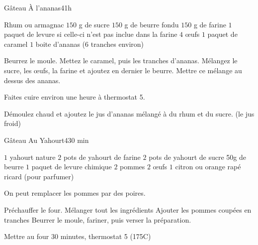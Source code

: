 \begin{recette}{Gâteau À l'ananas}{4}{}{1h}
\begin{ingredients}
\ingredient Rhum ou armagnac
\ingredient $150$ g de sucre
\ingredient $150$ g de beurre fondu
\ingredient $150$ g de farine
\ingredient $1$ paquet de levure si celle-ci n'est pas inclue dans la farine
\ingredient $4$ œufs
\ingredient $1$ paquet de caramel
\ingredient $1$ boite d'ananas ($6$ tranches environ)
\end{ingredients}

\begin{preparation}
\etape Beurrez le moule. Mettez le caramel, puis les tranches d'ananas.
\etape Mélangez le sucre, les œufs, la farine et ajoutez en dernier le beurre.
\etape Mettre ce mélange au dessus des ananas.
\end{preparation}

\begin{cuisson}
Faites cuire environ une heure à thermostat 5.

Démoulez chaud et ajoutez le jus d'ananas mélangé à du rhum et du sucre. (le jus froid)
\end{cuisson}

\end{recette}

\begin{recette}{Gâteau Au Yahourt}{4}{}{30 min}

\begin{ingredients}
\ingredient $1$ yahourt nature
\ingredient $2$ pots de yahourt de farine
\ingredient $2$ pots de yahourt de sucre
\ingredient 50g de beurre
\ingredient $1$ paquet de levure chimique
\ingredient $2$ pommes
\ingredient $2$ œufs
\ingredient $1$ citron ou orange rapé
\ingredient ricard (pour parfumer)
\end{ingredients}

\begin{remarque}
On peut remplacer les pommes par des poires.
\end{remarque}

\begin{preparation}
\etape Préchauffer le four.
\etape Mélanger tout les ingrédients
\etape Ajouter les pommes coupées en tranches
\etape Beurrer le moule, fariner, puis verser la préparation.
\end{preparation}

\begin{cuisson}
Mettre au four 30 minutes, thermostat 5 (175\degres C)
\end{cuisson}
\end{recette}


